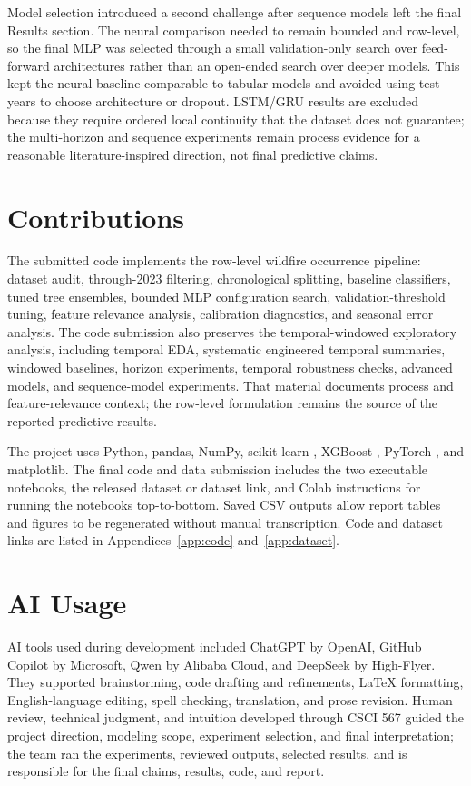 \documentclass{article}
\begin{document}
Model selection introduced a second challenge after sequence models left the final Results section. The neural comparison needed to remain bounded and row-level, so the final MLP was selected through a small validation-only search over feed-forward architectures rather than an open-ended search over deeper models. This kept the neural baseline comparable to tabular models and avoided using test years to choose architecture or dropout. LSTM/GRU results are excluded because they require ordered local continuity that the dataset does not guarantee; the multi-horizon and sequence experiments remain process evidence for a reasonable literature-inspired direction, not final predictive claims.

\section{Contributions}

The submitted code implements the row-level wildfire occurrence pipeline: dataset audit, through-2023 filtering, chronological splitting, baseline classifiers, tuned tree ensembles, bounded MLP configuration search, validation-threshold tuning, feature relevance analysis, calibration diagnostics, and seasonal error analysis. The code submission also preserves the temporal-windowed exploratory analysis, including temporal EDA, systematic engineered temporal summaries, windowed baselines, horizon experiments, temporal robustness checks, advanced models, and sequence-model experiments. That material documents process and feature-relevance context; the row-level formulation remains the source of the reported predictive results.

The project uses Python, pandas, NumPy, scikit-learn \citep{pedregosa2011scikit}, XGBoost \citep{chen2016xgboost}, PyTorch \citep{paszke2019pytorch}, and matplotlib. The final code and data submission includes the two executable notebooks, the released dataset or dataset link, and Colab instructions for running the notebooks top-to-bottom. Saved CSV outputs allow report tables and figures to be regenerated without manual transcription. Code and dataset links are listed in Appendices~\ref{app:code} and~\ref{app:dataset}.

\section{AI Usage}

AI tools used during development included ChatGPT by OpenAI, GitHub Copilot by Microsoft, Qwen by Alibaba Cloud, and DeepSeek by High-Flyer. They supported brainstorming, code drafting and refinements, LaTeX formatting, English-language editing, spell checking, translation, and prose revision. Human review, technical judgment, and intuition developed through CSCI 567 guided the project direction, modeling scope, experiment selection, and final interpretation; the team ran the experiments, reviewed outputs, selected results, and is responsible for the final claims, results, code, and report.
\end{document}
